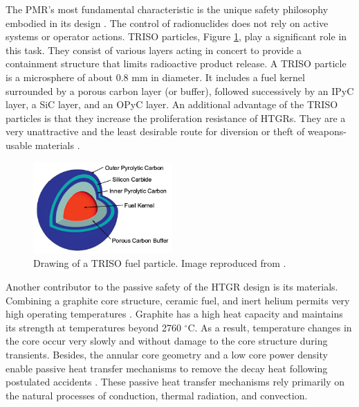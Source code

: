 The \gls{PMR}'s most fundamental characteristic is the unique safety philosophy embodied in its design \cite{iaea_current_2001}.
The control of radionuclides does not rely on active systems or operator actions.
\gls{TRISO} particles, Figure \ref{fig:triso}, play a significant role in this task.
They consist of various layers acting in concert to provide a containment structure that limits radioactive product release.
A \gls{TRISO} particle is a microsphere of about 0.8 mm in diameter.
It includes a fuel kernel surrounded by a porous carbon layer (or buffer), followed successively by an \gls{IPyC} layer, a \gls{SiC} layer, and an \gls{OPyC} layer.
An additional advantage of the \gls{TRISO} particles is that they increase the proliferation resistance of \glspl{HTGR}.
They are a very unattractive and the least desirable route for diversion or theft of weapons-usable materials \cite{huning_steady_2014}.

\begin{figure}[htbp!]
	\centering
	\includegraphics[height=3.5cm]{figures/triso}
	\caption{Drawing of a TRISO fuel particle. Image reproduced from \cite{hales_multidimensional_2013}.}
	\label{fig:triso}
\end{figure}

Another contributor to the passive safety of the \gls{HTGR} design is its materials.
Combining a graphite core structure, ceramic fuel, and inert helium permits very high operating temperatures \cite{ballinger_balance_2004}.
Graphite has a high heat capacity and maintains its strength at temperatures beyond 2760 $^{\circ}$C.
As a result, temperature changes in the core occur very slowly and without damage to the core structure during transients.
Besides, the annular core geometry and a low core power density enable passive heat transfer mechanisms to remove the decay heat following postulated accidents \cite{neylan_modular_1988}.
These passive heat transfer mechanisms rely primarily on the natural processes of conduction, thermal radiation, and convection.

